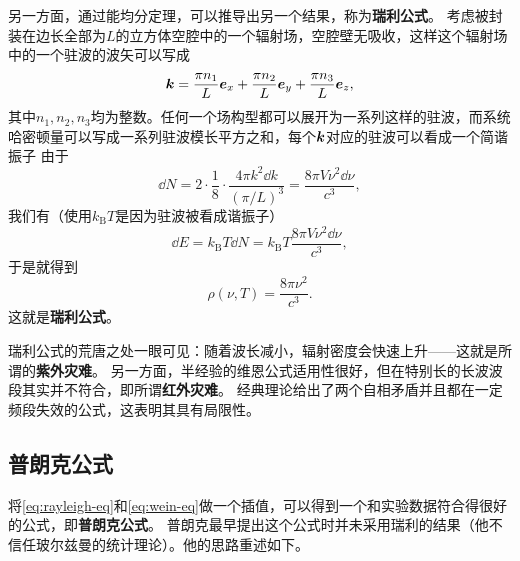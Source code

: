 \documentclass[UTF8, a4paper]{ctexart}
\begin{document}
另一方面，通过能均分定理，可以推导出另一个结果，称为\textbf{瑞利公式}。
考虑被封装在边长全部为$L$的立方体空腔中的一个辐射场，空腔壁无吸收，这样这个辐射场中的一个驻波的波矢可以写成
\begin{equation}
    \vb*{k} = \frac{\pi n_1}{L} \vb*{e}_x + \frac{\pi n_2}{L} \vb*{e}_y + \frac{\pi n_3}{L} \vb*{e}_z,
\end{equation}
其中$n_1, n_2, n_3$均为整数。任何一个场构型都可以展开为一系列这样的驻波，而系统哈密顿量可以写成一系列驻波模长平方之和，每个$\vb*{k}$对应的驻波可以看成一个简谐振子%
由于
\[
    \dd{N} = 2 \cdot \frac{1}{8} \cdot \frac{4\pi k^2 \dd{k}}{(\pi / L)^3} = \frac{8\pi V \nu^2 \dd{\nu}}{c^3},
\]
我们有（使用$k_\text{B} T$是因为驻波被看成谐振子）
\[
    \dd{E} = k_\text{B} T \dd{N} = k_\text{B} T \frac{8\pi V \nu^2 \dd{\nu}}{c^3},
\]
于是就得到
\begin{equation}
    \rho(\nu, T) = \frac{8\pi \nu^2}{c^3}.
    \label{eq:rayleigh-eq}
\end{equation}
这就是\textbf{瑞利公式}。

瑞利公式的荒唐之处一眼可见：随着波长减小，辐射密度会快速上升——这就是所谓的\textbf{紫外灾难}。
另一方面，半经验的维恩公式适用性很好，但在特别长的长波波段其实并不符合，即所谓\textbf{红外灾难}。
经典理论给出了两个自相矛盾并且都在一定频段失效的公式，这表明其具有局限性。

\subsection{普朗克公式}

将\eqref{eq:rayleigh-eq}和\eqref{eq:wein-eq}做一个插值，可以得到一个和实验数据符合得很好的公式，即\textbf{普朗克公式}。
普朗克最早提出这个公式时并未采用瑞利的结果（他不信任玻尔兹曼的统计理论）。他的思路重述如下。
\end{document}
